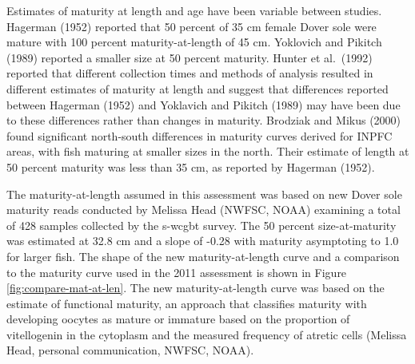 \documentclass[11pt,
  english,
  a4paper,
]{article}
\begin{document}
Estimates of maturity at length and age have been variable between studies. Hagerman {(1952)\leavevmode\tagmcend\tagstructend} reported that 50 percent of 35 cm female Dover sole were mature with 100 percent maturity-at-length of 45 cm. Yoklovich and Pikitch {(1989)\leavevmode\tagmcend\tagstructend} reported a smaller size at 50 percent maturity. Hunter et al.~{(1992)\leavevmode\tagmcend\tagstructend} reported that different collection times and methods of analysis resulted in different estimates of maturity at length and suggest that differences reported between Hagerman {(1952)\leavevmode\tagmcend\tagstructend} and Yoklavich and Pikitch {(1989)\leavevmode\tagmcend\tagstructend} may have been due to these differences rather than changes in maturity. Brodziak and Mikus {(2000)\leavevmode\tagmcend\tagstructend} found significant north-south differences in maturity curves derived for INPFC areas, with fish maturing at smaller sizes in the north. Their estimate of length at 50 percent maturity was less than 35 cm, as reported by Hagerman {(1952)\leavevmode\tagmcend\tagstructend}.

\leavevmode\tagmcend\tagstructend\par


The maturity-at-length assumed in this assessment was based on new Dover sole maturity reads conducted by Melissa Head (NWFSC, NOAA) examining a total of 428 samples collected by the \gls{s-wcgbt} survey. The 50 percent size-at-maturity was estimated at 32.8 cm and a slope of -0.28 with maturity asymptoting to 1.0 for larger fish. The shape of the new maturity-at-length curve and a comparison to the maturity curve used in the 2011 assessment is shown in Figure \ref{fig:compare-mat-at-len}. The new maturity-at-length curve was based on the estimate of functional maturity, an approach that classifies maturity with developing oocytes as mature or immature based on the proportion of vitellogenin in the cytoplasm and the measured frequency of atretic cells (Melissa Head, personal communication, NWFSC, NOAA).

\leavevmode\tagmcend\tagstructend\par
\end{document}
